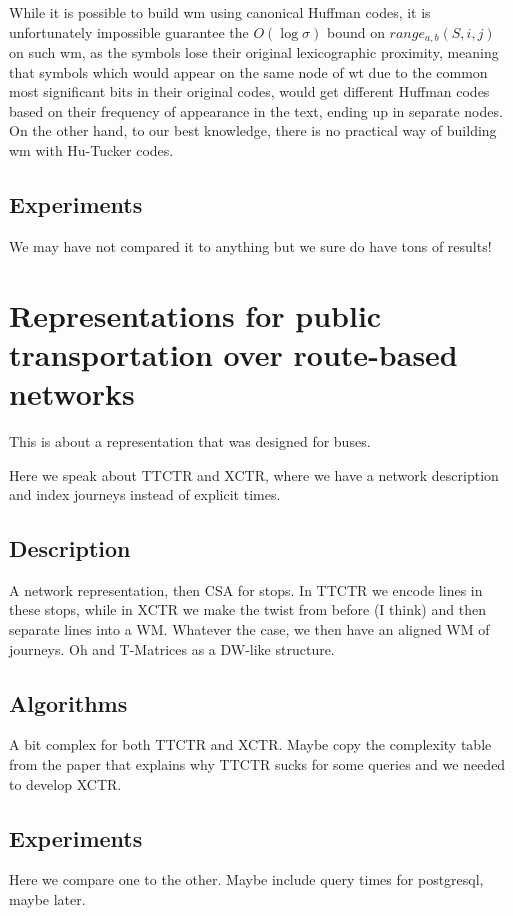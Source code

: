 \documentclass[a4paper,10pt,twoside]{book}
\begin{document}
    While it is possible to build \gls{wm} using canonical Huffman codes, it is unfortunately impossible guarantee the $O(\log\sigma)$ bound on $range_{a,b}(S,i,j)$ on such \gls{wm}, as the symbols lose their original lexicographic proximity, meaning that symbols which would appear on the same node of \gls{wt} due to the common most significant bits in their original codes, would get different Huffman codes based on their frequency of appearance in the text, ending up in separate nodes. On the other hand, to our best knowledge, there is no practical way of building \gls{wm} with Hu-Tucker codes.
	
	\section{Experiments}
	We may have not compared it to anything but we sure do have tons of results!
	
	\chapter{Representations for public transportation over route-based networks}
	\label{sec:newctr}
	This is about a representation that was designed for buses.
	
	Here we speak about TTCTR and XCTR, where we have a network description and index journeys instead of explicit times.
	
	\section{Description}
	A network representation, then CSA for stops. In TTCTR we encode lines in these stops, while in XCTR we make the twist from before (I think) and then separate lines into a WM. Whatever the case, we then have an aligned WM of journeys. Oh and T-Matrices as a DW-like structure.
	
	\section{Algorithms}
	A bit complex for both TTCTR and XCTR. Maybe copy the complexity table from the paper that explains why TTCTR sucks for some queries and we needed to develop XCTR.
	
	\section{Experiments}
	Here we compare one to the other. Maybe include query times for postgresql, maybe later.
	
\end{document}
